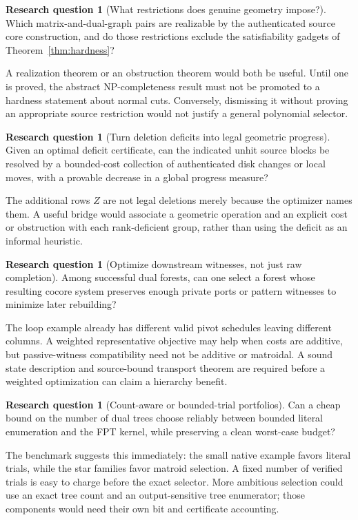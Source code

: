 \documentclass[11pt,letterpaper]{article}
\theoremstyle{definition}
\newtheorem{question}[theorem]{Research question}
\theoremstyle{remark}
\begin{document}
\begin{question}[What restrictions does genuine geometry impose?]
Which matrix-and-dual-graph pairs are realizable by the authenticated source core
construction, and do those restrictions exclude the satisfiability gadgets of
Theorem~\ref{thm:hardness}?
\end{question}
A realization theorem or an obstruction theorem would both be useful. Until
one is proved, the abstract NP-completeness result must not be promoted to a
hardness statement about normal cuts. Conversely, dismissing it without proving
an appropriate source restriction would not justify a general polynomial
selector.

\begin{question}[Turn deletion deficits into legal geometric progress]
Given an optimal deficit certificate, can the indicated unhit source blocks be
resolved by a bounded-cost collection of authenticated disk changes or local
moves, with a provable decrease in a global progress measure?
\end{question}
The additional rows $Z$ are not legal deletions merely because the optimizer
names them. A useful bridge would associate a geometric operation and an explicit
cost or obstruction with each rank-deficient group, rather than using the deficit
as an informal heuristic.

\begin{question}[Optimize downstream witnesses, not just raw completion]
Among successful dual forests, can one select a forest whose resulting cocore
system preserves enough private ports or pattern witnesses to minimize later
rebuilding?
\end{question}
The loop example already has different valid pivot schedules leaving different
columns. A weighted representative objective may help when costs are additive,
but passive-witness compatibility need not be additive or matroidal. A sound
state description and source-bound transport theorem are required before a
weighted optimization can claim a hierarchy benefit.

\begin{question}[Count-aware or bounded-trial portfolios]
Can a cheap bound on the number of dual trees choose reliably between bounded
literal enumeration and the FPT kernel, while preserving a clean worst-case
budget?
\end{question}
The benchmark suggests this immediately: the small native example favors
literal trials, while the star families favor matroid selection. A fixed number
of verified trials is easy to charge before the exact selector. More ambitious
selection could use an exact tree count and an output-sensitive tree enumerator;
those components would need their own bit and certificate accounting.
\end{document}
